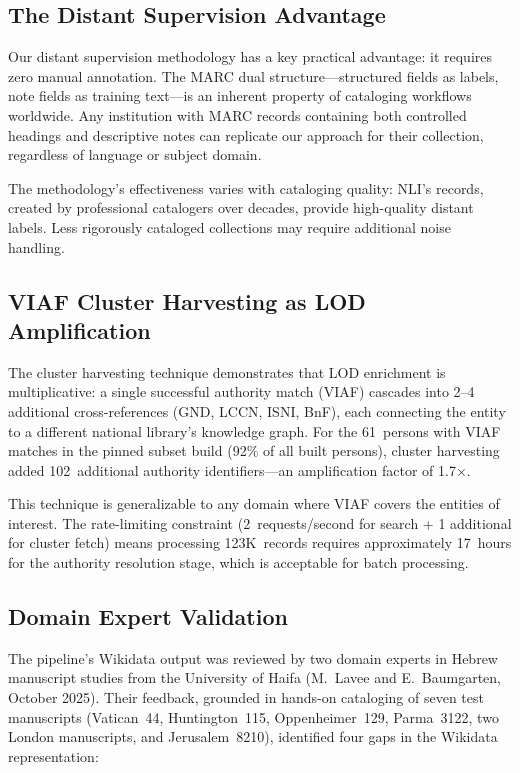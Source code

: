 \documentclass[Afour,sageh,times]{sagej}
\begin{document}
\subsection{The Distant Supervision Advantage}

Our distant supervision methodology has a key practical advantage: it requires zero manual annotation. The MARC dual structure---structured fields as labels, note fields as training text---is an inherent property of cataloging workflows worldwide. Any institution with MARC records containing both controlled headings and descriptive notes can replicate our approach for their collection, regardless of language or subject domain.

The methodology's effectiveness varies with cataloging quality: NLI's records, created by professional catalogers over decades, provide high-quality distant labels. Less rigorously cataloged collections may require additional noise handling.

\subsection{VIAF Cluster Harvesting as LOD Amplification}

The cluster harvesting technique demonstrates that LOD enrichment is multiplicative: a single successful authority match (VIAF) cascades into 2--4 additional cross-references (GND, LCCN, ISNI, BnF), each connecting the entity to a different national library's knowledge graph. For the 61~persons with VIAF matches in the pinned subset build (92\% of all built persons), cluster harvesting added 102~additional authority identifiers---an amplification factor of 1.7$\times$.

This technique is generalizable to any domain where VIAF covers the entities of interest. The rate-limiting constraint (2~requests/second for search + 1 additional for cluster fetch) means processing 123K~records requires approximately 17~hours for the authority resolution stage, which is acceptable for batch processing.

\subsection{Domain Expert Validation}

The pipeline's Wikidata output was reviewed by two domain experts in Hebrew manuscript studies from the University of Haifa (M.~Lavee and E.~Baumgarten, October 2025). Their feedback, grounded in hands-on cataloging of seven test manuscripts (Vatican~44, Huntington~115, Oppenheimer~129, Parma~3122, two London manuscripts, and Jerusalem~8210), identified four gaps in the Wikidata representation:
\end{document}
